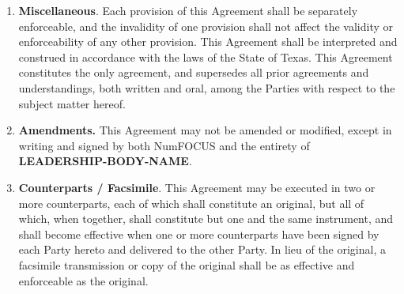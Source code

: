 \documentclass[english,letterpaper,12pt]{article}
\newcommand{\signatories}{\textbf{SIGNATORIES}}
\newcommand{\leadershipbody}{\textbf{LEADERSHIP-BODY-NAME}}
\begin{document}
\begin{enumerate}[label=\arabic*.,ref=\S~\arabic*]
\begin{enumerate}[label=\alph*.,ref=\theenumi(\arabic*)]
\item \textbf{Additional Search Periods}. If the Parties cannot agree on a
  Successor to sponsor the Project, the \leadershipbody{} shall have an
  additional 60 days to find a Successor willing and able to sponsor the
  Project. Any subsequent search periods of any length shall only be granted at
  NumFOCUS' written permission.

\item \textbf{Transfer to a Successor}. If a Successor has Qualified, the
  balance of assets in the Project Fund, together with any other assets held or
  liabilities incurred by NumFOCUS in connection with the Project, shall be
  transferred to the Successor within thirty (30) days of the approval of the
  Successor in writing by both Parties or any extension thereof, subject to the
  approval of any third parties that may be required.

\item \textbf{Termination Without a Successor}. If no Successor is found,
  NumFOCUS may dispose of Project assets and liabilities in any manner
  consistent with applicable tax and charitable trust laws.

\item \textbf{\signatories{}' Right to Terminate.}  The \signatories{} hereby
  acknowledge that they will relinquish any rights to terminate separate from
  the \leadershipbody{} as of the Effective Date.

\end{enumerate}

\item \textbf{Miscellaneous}. Each provision of this Agreement shall be
  separately enforceable, and the invalidity of one provision shall not affect
  the validity or enforceability of any other provision.  This Agreement shall
  be interpreted and construed in accordance with the laws of the State of
  Texas. This Agreement constitutes the only agreement, and supersedes all
  prior agreements and understandings, both written and oral, among the Parties
  with respect to the subject matter hereof.

\item \textbf{Amendments. }This Agreement may not be amended or modified,
  except in writing and signed by both NumFOCUS and the entirety of
  \leadershipbody{}.

\item \textbf{Counterparts / Facsimile}. This Agreement may be executed in two
  or more counterparts, each of which shall constitute an original, but all of
  which, when together, shall constitute but one and the same instrument, and
  shall become effective when one or more counterparts have been signed by each
  Party hereto and delivered to the other Party.  In lieu of the original, a
  facsimile transmission or copy of the original shall be as effective and
  enforceable as the original.

\end{enumerate}
\end{document}
